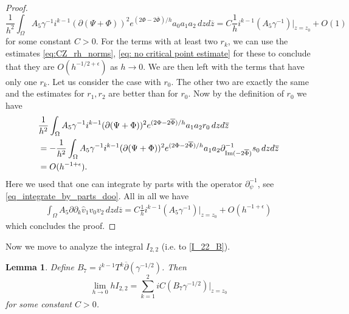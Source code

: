 \documentclass[a4paper, 10pt, twoside, notitlepage]{amsart}
\theoremstyle{plain}
\newtheorem{lem}[prop]{Lemma}
\newcommand{\Om}{\Omega}
\numberwithin{equation}{section}
\newcommand {\p} {\partial}
\newcommand{\e}{\epsilon}
\newcommand{\dbar}{\ol{\p}}
\newcommand{\ol}[1]{\overline{#1}}
\newcommand{\oz}{\overline{z}}
\DeclareMathOperator {\Imm} {Im}
\begin{document}
\begin{proof}
	\begin{equation*}
		\frac{1}{h^2}\int_{\Om}A_5\gamma^{-1}i^{k-1}(\p(\Psi + \Phi))^2e^{(2\Phi - 2\ol{\Phi})/h}a_0a_1a_2\,dzd\oz = C\frac{1}{h}i^{k-1}(A_5\gamma^{-1})|_{z=z_0} + O(1)
	\end{equation*}
	for some constant $C>0$. For the terms with at least two $r_k$, we can use the estimates \eqref{eq:CZ_rh_norms}, \eqref{eq: no critical point estimate} for these to conclude that they are $O(h^{-1/2+\e})$ as $h\to 0$. We are then left with the terms that have only one $r_k$. Let us consider the case with $r_0$. The other two are exactly the same and the estimates for $r_1, r_2$ are better than for $r_0$. Now by the definition of $r_0$ we have
	\begin{align}\label{A_5_last}
		&\frac{1}{h^2}\int_{\Om}A_5\gamma^{-1}i^{k-1}(\p(\Psi + \Phi))^2e^{(2\Phi - 2\ol{\Phi})/h}a_1a_2r_0\,dzd\oz\\\notag
		&=-\frac{1}{h^2}\int_{\Om}A_5\gamma^{-1}i^{k-1}(\p(\Psi + \Phi))^2e^{(2\Phi - 2\ol{\Phi})/h}a_1a_2\p^{-1}_{\Imm(-2\ol{\Phi})}s_0\,dzd\oz\\\notag
        &= O(h^{-1+\e}).
	\end{align}
	Here we used that one can integrate by parts with the operator $\p^{-1}_{\psi}$, see \eqref{eq_integrate_by_parts_doo}.
    All in all we have
	\begin{align}\label{A_5}
		\int_{\Om}A_5\p\p_k \hat{v}_1v_0v_2\,dzd\oz = C\frac{1}{h}i^{k-1}(A_5\gamma^{-1})|_{z=z_0} + O(h^{-1+\e})
	\end{align}
	which concludes the proof.
\end{proof}

Now we move to analyze the integral $I_{2,2}$ (i.e. to \eqref{I_22_B}).

\begin{lem}\label{lemma_B}
	Define $B_7=i^{k-1}T^k\dbar(\gamma^{-1/2})$. Then
	\begin{equation*}
		\lim_{h\to 0} hI_{2,2} = \sum_{k=1}^2iC(B_7\gamma^{-1/2})|_{z=z_0}
	\end{equation*}
	for some constant $C>0$.
\end{lem}
\end{document}
